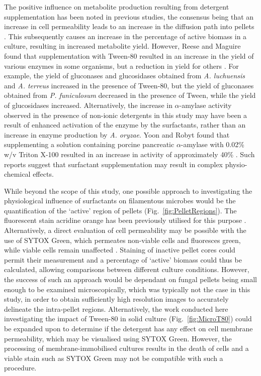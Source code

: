 The positive influence on metabolite production resulting from detergent supplementation has been noted in previous studies, the consensus being that an increase in cell permeability leads to an increase in the diffusion path into pellets \cite{znidarsic2000,domingues2000}. This subsequently causes an increase in the percentage of active biomass in a culture, resulting in increased metabolite yield. However, Reese and Maguire found that supplementation with Tween-80 resulted in an increase in the yield of various enzymes in some organisms, but a reduction in yield for others \cite{reese1969}. For example, the yield of gluconases and glucosidases obtained from \emph{A. luchuensis} and \emph{A. terreus} increased in the presence of Tween-80, but the yield of gluconases obtained from \emph{P. funiculosum} decreased in the presence of Tween, while the yield of glucosidases increased. Alternatively, the increase in $\alpha$-amylase activity observed in the presence of non-ionic detergents in this study may have been a result of enhanced activation of the enzyme by the surfactants, rather than an increase in enzyme production by \emph{A. oryzae}. Yoon and Robyt found that supplementing a solution containing porcine pancreatic $\alpha$-amylase with 0.02\% w/v Triton X-100 resulted in an increase in activity of approximately 40\% \cite{yoon2005}. Such reports suggest that surfactant supplementation may result in complex physio-chemical effects.

While beyond the scope of this study, one possible approach to investigating the physiological influence of surfactants on filamentous microbes would be the quantification of the \lq  active' region of pellets (Fig.~\ref{fig:PelletRegions}). The fluorescent stain acridine orange has been previously utilised for this purpose \cite{elenshasy2006}. Alternatively, a direct evaluation of cell permeability may be possible with the use of SYTOX Green, which permeates non-viable cells and fluoresces green, while viable cells remain unaffected \cite{thevissen1999,theis2003}. Staining of inactive pellet cores could permit their measurement and a percentage of \lq active' biomass could thus be calculated, allowing comparisons between different culture conditions. However, the success of such an approach would be dependant on fungal pellets being small enough to be examined microscopically, which was typically not the case in this study, in order to obtain sufficiently high resolution images to accurately delineate the intra-pellet regions. Alternatively, the work conducted here investigating the impact of Tween-80 in solid culture (Fig.~\ref{fig:MicroT80}) could be expanded upon to determine if the detergent has any effect on cell membrane permeability, which may be visualised using SYTOX Green. However, the processing of membrane-immobilised cultures results in the death of cells and a viable stain such as SYTOX Green may not be compatible with such a procedure.

